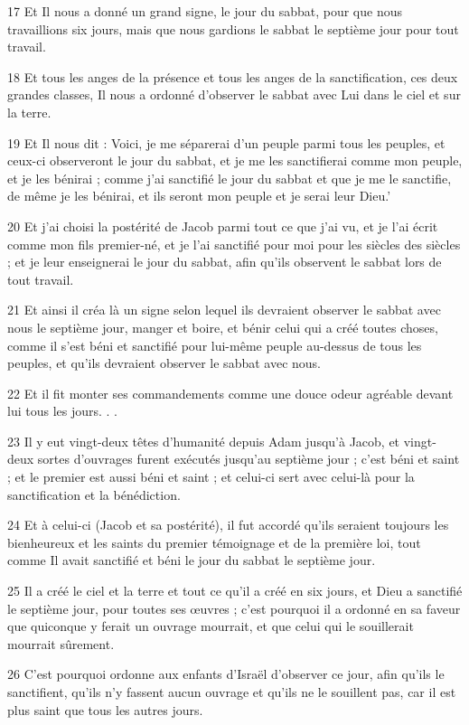 \par 17 Et Il nous a donné un grand signe, le jour du sabbat, pour que nous travaillions six jours, mais que nous gardions le sabbat le septième jour pour tout travail.
\par 18 Et tous les anges de la présence et tous les anges de la sanctification, ces deux grandes classes, Il nous a ordonné d'observer le sabbat avec Lui dans le ciel et sur la terre.
\par 19 Et Il nous dit : Voici, je me séparerai d'un peuple parmi tous les peuples, et ceux-ci observeront le jour du sabbat, et je me les sanctifierai comme mon peuple, et je les bénirai ; comme j'ai sanctifié le jour du sabbat et que je me le sanctifie, de même je les bénirai, et ils seront mon peuple et je serai leur Dieu.'
\par 20 Et j'ai choisi la postérité de Jacob parmi tout ce que j'ai vu, et je l'ai écrit comme mon fils premier-né, et je l'ai sanctifié pour moi pour les siècles des siècles ; et je leur enseignerai le jour du sabbat, afin qu'ils observent le sabbat lors de tout travail.
\par 21 Et ainsi il créa là un signe selon lequel ils devraient observer le sabbat avec nous le septième jour, manger et boire, et bénir celui qui a créé toutes choses, comme il s'est béni et sanctifié pour lui-même peuple au-dessus de tous les peuples, et qu'ils devraient observer le sabbat avec nous.
\par 22 Et il fit monter ses commandements comme une douce odeur agréable devant lui tous les jours. . .
\par 23 Il y eut vingt-deux têtes d'humanité depuis Adam jusqu'à Jacob, et vingt-deux sortes d'ouvrages furent exécutés jusqu'au septième jour ; c'est béni et saint ; et le premier est aussi béni et saint ; et celui-ci sert avec celui-là pour la sanctification et la bénédiction.
\par 24 Et à celui-ci (Jacob et sa postérité), il fut accordé qu'ils seraient toujours les bienheureux et les saints du premier témoignage et de la première loi, tout comme Il avait sanctifié et béni le jour du sabbat le septième jour.
\par 25 Il a créé le ciel et la terre et tout ce qu'il a créé en six jours, et Dieu a sanctifié le septième jour, pour toutes ses œuvres ; c'est pourquoi il a ordonné en sa faveur que quiconque y ferait un ouvrage mourrait, et que celui qui le souillerait mourrait sûrement.
\par 26 C'est pourquoi ordonne aux enfants d'Israël d'observer ce jour, afin qu'ils le sanctifient, qu'ils n'y fassent aucun ouvrage et qu'ils ne le souillent pas, car il est plus saint que tous les autres jours.
